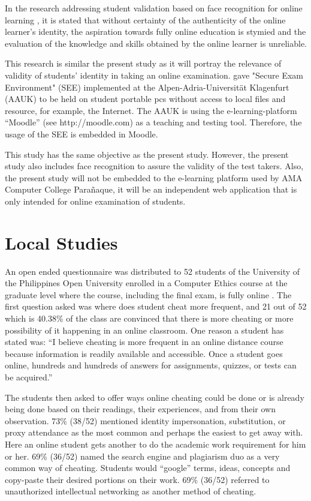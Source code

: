 In the research addressing student validation based on face recognition for online learning \cite{labayen2014smowl}, it is stated that without certainty of the authenticity of the online learner’s identity, the aspiration towards fully online education is stymied and the evaluation of the knowledge and skills obtained by the online learner is unreliable.

This research is similar the present study as it will portray the relevance of validity of students’ identity in taking an online examination.
 gave "Secure Exam Environment" (SEE) implemented at the Alpen-Adria-Universität Klagenfurt (AAUK) to be held on student portable pcs without access to local files and resource, for example, the Internet.
The AAUK is using the e-learning-platform “Moodle” (see http://moodle.com) as a teaching and testing tool.
Therefore, the usage of the SEE is embedded in Moodle.

This study has the same objective as the present study.
However, the present study also includes face recognition to assure the validity of the test takers.
Also, the present study will not be embedded to the e-learning platform used by AMA Computer College Parañaque, it will be an independent web application that is only intended for online examination of students.

\section{Local Studies}

An open ended questionnaire was distributed to 52 students of the University of the Philippines Open University enrolled in a Computer Ethics course at the graduate level where the course, including the final exam, is fully online \cite{ravasco2012technology}.
The first question asked was where does student cheat more frequent, and 21 out of 52 which is 40.38\% of the class are convinced that there is more cheating or more possibility of it happening in an online classroom.
One reason a student has stated was: “I believe cheating is more frequent in an online distance course because information is readily available and accessible.
Once a student goes online, hundreds and hundreds of answers for assignments, quizzes, or tests can be acquired.”

The students then asked to offer ways online cheating could be done or is already being done based on their readings, their experiences, and from their own observation.
73\% (38/52) mentioned identity impersonation, substitution, or proxy attendance as the most common and perhaps the easiest to get away with.
Here an online student gets another to do the academic work requirement for him or her.
69\% (36/52) named the search engine and plagiarism duo as a very common way of cheating.
Students would “google” terms, ideas, concepts and copy-paste their desired portions on their work.
69\% (36/52) referred to unauthorized intellectual networking as another method of cheating.

